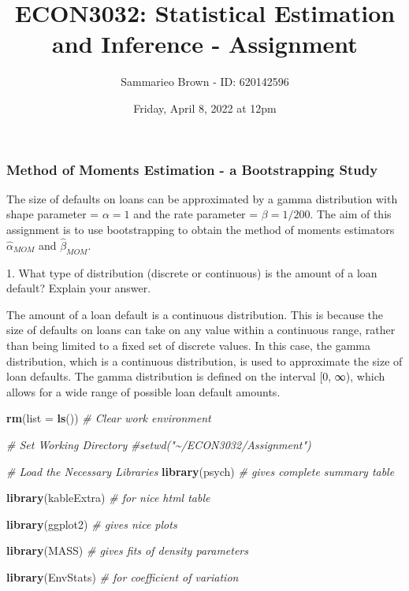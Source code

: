 \documentclass[
]{article}
\title{ECON3032: Statistical Estimation and Inference - Assignment}
\author{Sammarieo Brown - ID: 620142596}
\date{Friday, April 8, 2022 at 12pm}
\newenvironment{Shaded}{\begin{snugshade}}{\end{snugshade}}
\newcommand{\AttributeTok}[1]{\textcolor[rgb]{0.13,0.29,0.53}{#1}}
\newcommand{\CommentTok}[1]{\textcolor[rgb]{0.56,0.35,0.01}{\textit{#1}}}
\newcommand{\FunctionTok}[1]{\textcolor[rgb]{0.13,0.29,0.53}{\textbf{#1}}}
\newcommand{\NormalTok}[1]{#1}
\begin{document}
\maketitle

\hypertarget{method-of-moments-estimation---a-bootstrapping-study}{%
\subsubsection{Method of Moments Estimation - a Bootstrapping
Study}\label{method-of-moments-estimation---a-bootstrapping-study}}

{ The size of defaults on loans can be approximated by a gamma
distribution with shape parameter = \(\alpha = 1\) and the rate
parameter = \(\beta = 1/200\). The aim of this assignment is to use
bootstrapping to obtain the method of moments estimators
\(\hat{\alpha}_{MOM}\) and \(\hat{\beta}_{MOM}\).\\
}

{ 1. What type of distribution (discrete or continuous) is the amount of
a loan default? Explain your answer.}

The amount of a loan default is a continuous distribution. This is
because the size of defaults on loans can take on any value within a
continuous range, rather than being limited to a fixed set of discrete
values. In this case, the gamma distribution, which is a continuous
distribution, is used to approximate the size of loan defaults. The
gamma distribution is defined on the interval {[}0, ∞), which allows for
a wide range of possible loan default amounts.

\begin{Shaded}
\begin{Highlighting}[]
\FunctionTok{rm}\NormalTok{(}\AttributeTok{list =} \FunctionTok{ls}\NormalTok{()) }\CommentTok{\# Clear work environment}

\CommentTok{\# Set Working Directory}
\CommentTok{\#setwd("\textasciitilde{}/ECON3032/Assignment")}

\CommentTok{\# Load the Necessary Libraries}
\FunctionTok{library}\NormalTok{(psych) }\CommentTok{\# gives complete summary table}

\FunctionTok{library}\NormalTok{(kableExtra) }\CommentTok{\# for nice html table}

\FunctionTok{library}\NormalTok{(ggplot2) }\CommentTok{\# gives nice plots}

\FunctionTok{library}\NormalTok{(MASS) }\CommentTok{\# gives fits of density parameters}

\FunctionTok{library}\NormalTok{(EnvStats) }\CommentTok{\# for coefficient of variation}
\end{Highlighting}
\end{Shaded}
\end{document}
